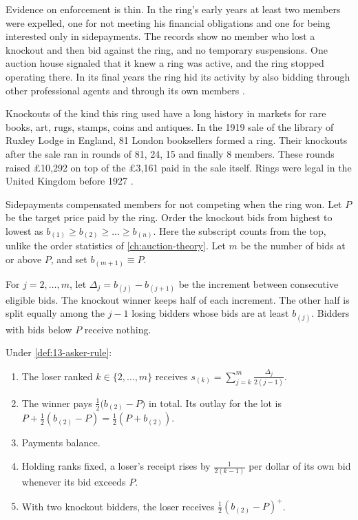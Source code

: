 Evidence on enforcement is thin. In the ring's early years at least two members were expelled, one for not
meeting his financial obligations and one for being interested only in sidepayments. The records show no member
who lost a knockout and then bid against the ring, and no temporary suspensions. One auction house signaled
that it knew a ring was active, and the ring stopped operating there. In its final years the ring hid its
activity by also bidding through other professional agents and through its own members
\citep[p.~728]{Asker2010}.

Knockouts of the kind this ring used have a long history in markets for rare books, art, rugs, stamps, coins
and antiques. In the 1919 sale of the library of Ruxley Lodge in England, 81 London booksellers formed a ring.
Their knockouts after the sale ran in rounds of 81, 24, 15 and finally 8 members. These rounds raised
\pounds10,292 on top of the \pounds3,161 paid in the sale itself. Rings were legal in the United Kingdom before
1927 \citep[p.~726]{Asker2010}.

Sidepayments compensated members for not competing when the ring won. Let $P$ be the target price paid by the
ring. Order the knockout bids from highest to lowest as $b_{(1)}\ge b_{(2)}\ge\dots\ge b_{(n)}$. Here the
subscript counts from the top, unlike the order statistics of \cref{ch:auction-theory}. Let $m$ be the number
of bids at or above $P$, and set $b_{(m+1)}\equiv P$.

\begin{definition}\label{def:13-asker-rule}
For $j=2,\dots,m$, let $\Delta_j=b_{(j)}-b_{(j+1)}$ be the increment between consecutive eligible bids. The
knockout winner keeps half of each increment. The other half is split equally among the $j-1$ losing bidders
whose bids are at least $b_{(j)}$. Bidders with bids below $P$ receive nothing.
\end{definition}

\begin{proposition}\label{prop:13-asker-sidepay}
Under \cref{def:13-asker-rule}:
\begin{enumerate}[label=(\roman*)]
\item The loser ranked $k\in\{2,\dots,m\}$ receives $s_{(k)}=\sum_{j=k}^{m}\frac{\Delta_j}{2(j-1)}$.
\item The winner pays $\frac{1}{2}\bigl(b_{(2)}-P\bigr)$ in total. Its outlay for the lot is
$P+\frac{1}{2}(b_{(2)}-P)=\frac{1}{2}(P+b_{(2)})$.
\item Payments balance.
\item Holding ranks fixed, a loser's receipt rises by $\frac{1}{2(k-1)}$ per dollar of its own bid whenever its
bid exceeds $P$.
\item With two knockout bidders, the loser receives $\frac{1}{2}(b_{(2)}-P)^+$.
\end{enumerate}
\end{proposition}

